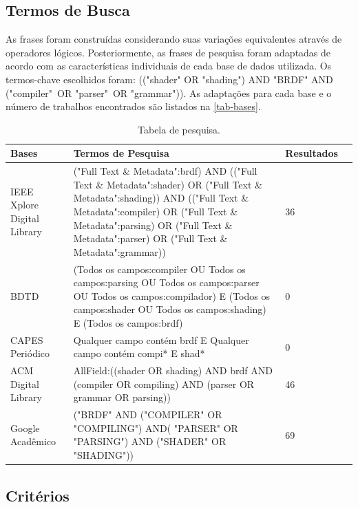 \subsection{Termos de Busca}
 As frases foram construídas considerando suas variações equivalentes através de operadores lógicos. Posteriormente, as frases de pesquisa foram adaptadas de acordo com as características individuais de cada base de dados utilizada. Os termos-chave escolhidos foram: (("shader" OR "shading") AND "BRDF" AND ("compiler"\ OR "parser"\ OR "grammar")). As adaptações para cada base e o número de trabalhos encontrados são listados na \autoref{tab-bases}.



\begin{table}[H]
\ABNTEXfontereduzida
\caption[bases]{\small Tabela de pesquisa.}
\label{tab-bases}
\begin{tabular}{p{2.6cm}|p{6.0cm}|p{2.25cm}|p{3.40cm}}
   \textbf{Bases} & \textbf{Termos de Pesquisa}  & \textbf{Resultados}\\
   \hline
    IEEE Xplore Digital Library
    &
    ("Full Text \& Metadata":brdf)
AND (("Full Text \& Metadata":shader) OR  ("Full Text \& Metadata":shading))
AND (("Full Text \& Metadata":compiler) OR  ("Full Text \& Metadata":parsing) OR  ("Full Text \& Metadata":parser) OR  ("Full Text \& Metadata":grammar))
   & 36
    \\ \hline


    BDTD
    & (Todos os campos:compiler OU Todos os campos:parsing OU Todos os campos:parser OU Todos os campos:compilador) E (Todos os campos:shader OU Todos os campos:shading) E (Todos os campos:brdf)
    & 0
    \\ \hline
    CAPES Periódico
    &  Qualquer campo contém brdf E 
 Qualquer campo contém compi* E shad*  
    & 0
    \\ \hline


  ACM Digital Library
  & AllField:((shader OR shading) AND brdf AND (compiler OR compiling) AND (parser OR grammar OR parsing))
  & 46
    \\ \hline


 Google Acadêmico
  & 
  ("BRDF" AND ("COMPILER" OR "COMPILING") AND( "PARSER" OR "PARSING") AND ("SHADER" OR "SHADING"))
  & 69
\end{tabular}
\end{table}


\subsection{Critérios}


